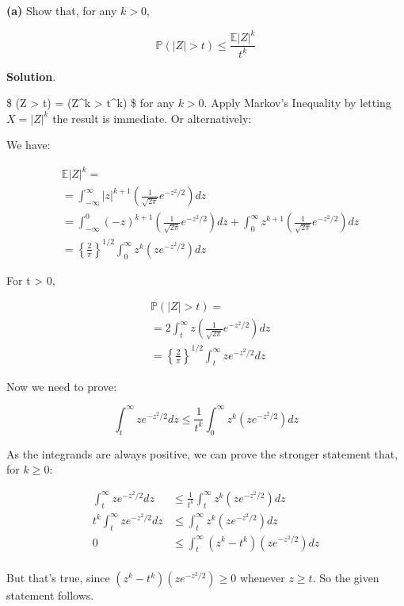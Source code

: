 \textbf{(a)} Show that, for any \(k > 0\),

\[\mathbb{P}(|Z| > t) \leq \frac{\mathbb{E}|Z|^k}{t^k}\]

\textbf{Solution}.

\$ (\textbar Z\textbar{} \textgreater{} t) = 
(\textbar Z\textbar\^{}k \textgreater{} t\^{}k) \$ for any \(k > 0\).
Apply Markov's Inequality by letting \(X = |Z|^k\) the result is
immediate. Or alternatively:

We have:

\begin{align}
&\mathbb{E}|Z|^k = \\
&= \int _{-\infty}^{\infty} |z|^{k+1}\left( \frac{1}{\sqrt{2\pi}} e^{-z^2/2} \right) dz \\
&= \int _{-\infty}^{0} (-z)^{k+1}\left( \frac{1}{\sqrt{2\pi}} e^{-z^2/2} \right) dz
  + \int _{0}^{\infty} z^{k+1}\left( \frac{1}{\sqrt{2\pi}} e^{-z^2/2} \right) dz \\
&=  \left\{ \frac{2}{\pi} \right\}^{1/2} \int _{0}^{\infty} z^k \left( z e^{-z^2/2} \right) dz
\end{align}

For t \textgreater{} 0,

\begin{align}
&\mathbb{P}(|Z| > t) = \\
&= 2 \int _t^{\infty} z\left( \frac{1}{\sqrt{2\pi}} e^{-z^2/2} \right) dz \\
&= \left\{ \frac{2}{\pi} \right\}^{1/2} \int _t^{\infty} z e^{-z^2/2} dz
\end{align}

Now we need to prove:

\[\int _t^{\infty} z e^{-z^2/2} dz \leq \frac{1}{t^k}\int _{0}^{\infty} z^k \left( z e^{-z^2/2} \right) dz \]

As the integrands are always positive, we can prove the stronger
statement that, for \(k \geq 0\):

\begin{align}
\int _t^{\infty} z e^{-z^2/2} dz & \leq \frac{1}{t^k}\int _{t}^{\infty} z^k \left( z e^{-z^2/2} \right) dz  \\
t^k \int _t^{\infty} z e^{-z^2/2} dz & \leq \int _{t}^{\infty} z^k \left( z e^{-z^2/2} \right) dz  \\
0 & \leq \int _{t}^{\infty} (z^k - t^k) \left( z e^{-z^2/2} \right) dz  \\
\end{align}

But that's true, since \((z^k - t^k) (z e^{-z^2/2}) \geq 0\) whenever
\(z \geq t\). So the given statement follows.

